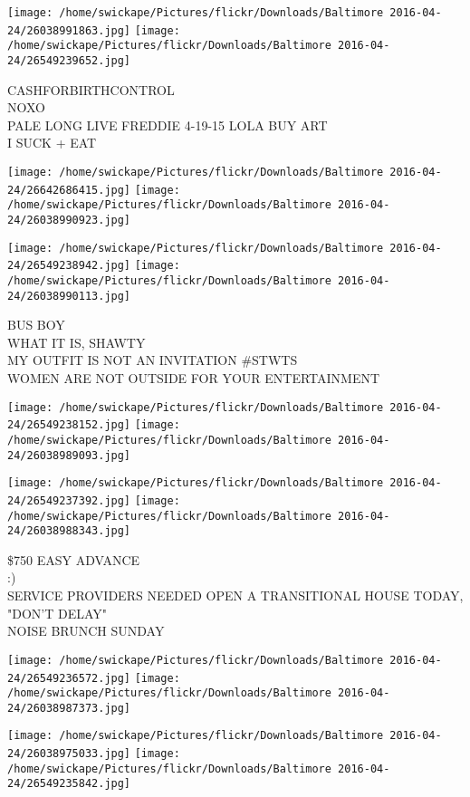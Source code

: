 \documentclass[10pt,letterpaper]{article}
\begin{document}
\texttt{[image: /home/swickape/Pictures/flickr/Downloads/Baltimore 2016-04-24/26038991863.jpg]}
\texttt{[image: /home/swickape/Pictures/flickr/Downloads/Baltimore 2016-04-24/26549239652.jpg]}

CASHFORBIRTHCONTROL\\
NOXO\\
PALE LONG LIVE FREDDIE 4{-}19{-}15 LOLA BUY ART\\
I SUCK + EAT\\
\pagebreak

\texttt{[image: /home/swickape/Pictures/flickr/Downloads/Baltimore 2016-04-24/26642686415.jpg]}
\texttt{[image: /home/swickape/Pictures/flickr/Downloads/Baltimore 2016-04-24/26038990923.jpg]}

\texttt{[image: /home/swickape/Pictures/flickr/Downloads/Baltimore 2016-04-24/26549238942.jpg]}
\texttt{[image: /home/swickape/Pictures/flickr/Downloads/Baltimore 2016-04-24/26038990113.jpg]}

BUS BOY\\
WHAT IT IS, SHAWTY\\
MY OUTFIT IS NOT AN INVITATION \#STWTS\\
WOMEN ARE NOT OUTSIDE FOR YOUR ENTERTAINMENT\\
\pagebreak

\texttt{[image: /home/swickape/Pictures/flickr/Downloads/Baltimore 2016-04-24/26549238152.jpg]}
\texttt{[image: /home/swickape/Pictures/flickr/Downloads/Baltimore 2016-04-24/26038989093.jpg]}

\texttt{[image: /home/swickape/Pictures/flickr/Downloads/Baltimore 2016-04-24/26549237392.jpg]}
\texttt{[image: /home/swickape/Pictures/flickr/Downloads/Baltimore 2016-04-24/26038988343.jpg]}

\$750 EASY ADVANCE\\
:)\\
SERVICE PROVIDERS NEEDED OPEN A TRANSITIONAL HOUSE TODAY, "DON'T DELAY"\\
NOISE BRUNCH SUNDAY\\
\pagebreak

\texttt{[image: /home/swickape/Pictures/flickr/Downloads/Baltimore 2016-04-24/26549236572.jpg]}
\texttt{[image: /home/swickape/Pictures/flickr/Downloads/Baltimore 2016-04-24/26038987373.jpg]}

\texttt{[image: /home/swickape/Pictures/flickr/Downloads/Baltimore 2016-04-24/26038975033.jpg]}
\texttt{[image: /home/swickape/Pictures/flickr/Downloads/Baltimore 2016-04-24/26549235842.jpg]}
\end{document}
